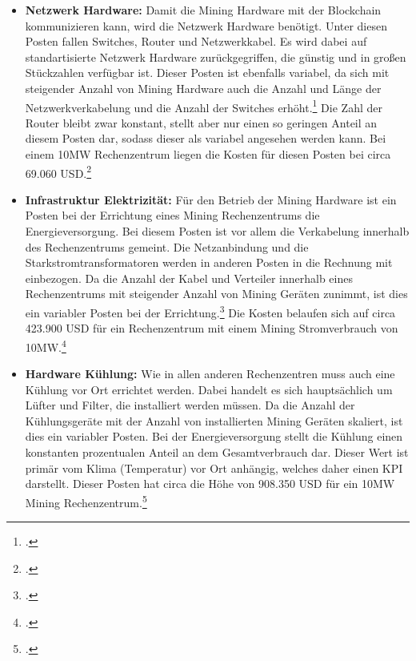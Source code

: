 \begin{itemize}
    Der Posten der Mining Hardware ist variabel, da sich dieser proportional zur Anzahl der Miner verhält. Bei einem
    10MW Rechenzentrum wären dies circa 2.987 S19 Pro Miner\footcite[Vgl.][]{appendix:s19proassumptions} bei einem Gesamtpreis
    von circa 8.068.708 USD.\footcite[Vgl.][]{appendix:capex}
    \item \textbf{Netzwerk Hardware: }Damit die Mining Hardware mit der Blockchain kommunizieren kann, wird die Netzwerk
    Hardware benötigt. Unter diesen Posten fallen Switches, Router und Netzwerkkabel. Es wird dabei auf standartisierte
    Netzwerk Hardware zurückgegriffen, die günstig und in großen Stückzahlen verfügbar ist. Dieser Posten ist ebenfalls
    variabel, da sich mit steigender Anzahl von Mining Hardware auch die Anzahl und Länge der Netzwerkverkabelung und die Anzahl
    der Switches erhöht.\footcite[Vgl.][]{appendix:capex} Die Zahl der Router bleibt zwar konstant, stellt aber nur einen so
    geringen Anteil an diesem Posten dar, sodass dieser als variabel angesehen werden kann. Bei einem 10MW Rechenzentrum
    liegen die Kosten für diesen Posten bei circa 69.060 USD.\footcite[Vgl.][]{appendix:capex}
    \item \textbf{Infrastruktur Elektrizität: }Für den Betrieb der Mining Hardware ist ein Posten bei der Errichtung
    eines Mining Rechenzentrums die Energieversorgung. Bei diesem Posten ist vor allem die Verkabelung innerhalb des
    Rechenzentrums gemeint. Die Netzanbindung und die Starkstromtransformatoren werden in anderen Posten in die Rechnung
    mit einbezogen. Da  die Anzahl der Kabel und Verteiler innerhalb eines Rechenzentrums mit steigender Anzahl von Mining
    Geräten zunimmt, ist dies ein variabler Posten bei der Errichtung.\footcite[Vgl.][]{appendix:capex} Die Kosten belaufen
    sich auf circa 423.900 USD für ein Rechenzentrum mit einem Mining Stromverbrauch von 10MW.\footcite[Vgl.][]{appendix:capex}
    \item \textbf{Hardware Kühlung: }Wie in allen anderen Rechenzentren muss auch eine Kühlung vor Ort errichtet werden.
    Dabei handelt es sich hauptsächlich um Lüfter und Filter, die installiert werden müssen.
    Da die Anzahl der Kühlungsgeräte mit der Anzahl von installierten Mining Geräten skaliert, ist dies ein variabler Posten.
    Bei der Energieversorgung stellt die Kühlung einen konstanten prozentualen Anteil an dem Gesamtverbrauch dar.
    Dieser Wert ist primär vom Klima (Temperatur) vor Ort anhängig, welches daher einen \ac{KPI} darstellt. Dieser Posten
    hat circa die Höhe von 908.350 USD für ein 10MW Mining Rechenzentrum.\footcite[Vgl.][]{appendix:capex}

\end{itemize}
